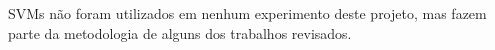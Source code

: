 SVMs não foram utilizados em nenhum experimento deste projeto, mas fazem parte da metodologia de alguns dos trabalhos revisados.
 







